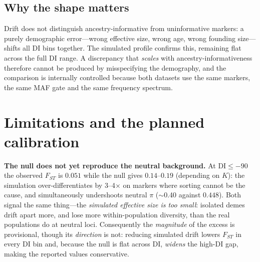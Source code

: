 \documentclass[11pt,a4paper]{article}
\begin{document}
\subsection{Why the shape matters}

Drift does not distinguish ancestry-informative from uninformative markers: a
purely demographic error---wrong effective size, wrong age, wrong founding
size---shifts all DI bins together. The simulated profile confirms this,
remaining flat across the full DI range. A discrepancy that \emph{scales} with
ancestry-informativeness therefore cannot be produced by misspecifying the
demography, and the comparison is internally controlled because both datasets
use the same markers, the same MAF gate and the same frequency spectrum.

\section{Limitations and the planned calibration}

\textbf{The null does not yet reproduce the neutral background.} At
$\mathrm{DI}\le-90$ the observed $F_{ST}$ is $0.051$ while the null gives
$0.14$--$0.19$ (depending on $K$): the simulation over-differentiates by
3--4$\times$ on markers where sorting cannot be the cause, and simultaneously
undershoots neutral $\pi$ ($\sim$0.40 against $0.448$). Both signal the same
thing---the \emph{simulated effective size is too small}: isolated demes drift
apart more, and lose more within-population diversity, than the real populations
do at neutral loci. Consequently the \emph{magnitude} of the excess is
provisional, though its \emph{direction} is not: reducing simulated drift lowers
$F_{ST}$ in every DI bin and, because the null is flat across DI, \emph{widens}
the high-DI gap, making the reported values conservative.
\end{document}

